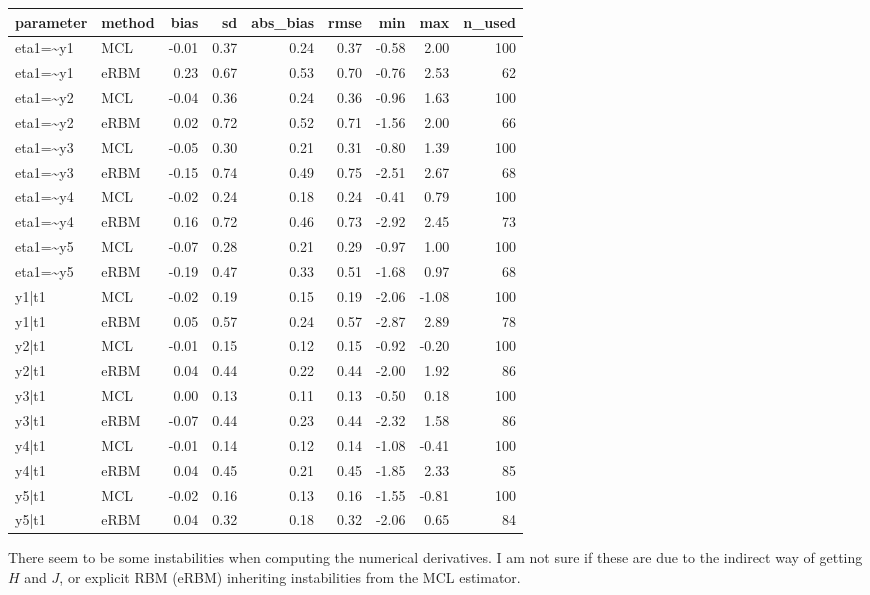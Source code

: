 \documentclass[
]{article}
\begin{document}
\begin{tabular}[t]{llrrrrrrr}
\toprule
parameter & method & bias & sd & abs\_bias & rmse & min & max & n\_used\\
\midrule
eta1=\textasciitilde{}y1 & MCL & -0.01 & 0.37 & 0.24 & 0.37 & -0.58 & 2.00 & 100\\
eta1=\textasciitilde{}y1 & eRBM & 0.23 & 0.67 & 0.53 & 0.70 & -0.76 & 2.53 & 62\\
eta1=\textasciitilde{}y2 & MCL & -0.04 & 0.36 & 0.24 & 0.36 & -0.96 & 1.63 & 100\\
eta1=\textasciitilde{}y2 & eRBM & 0.02 & 0.72 & 0.52 & 0.71 & -1.56 & 2.00 & 66\\
eta1=\textasciitilde{}y3 & MCL & -0.05 & 0.30 & 0.21 & 0.31 & -0.80 & 1.39 & 100\\
eta1=\textasciitilde{}y3 & eRBM & -0.15 & 0.74 & 0.49 & 0.75 & -2.51 & 2.67 & 68\\
eta1=\textasciitilde{}y4 & MCL & -0.02 & 0.24 & 0.18 & 0.24 & -0.41 & 0.79 & 100\\
eta1=\textasciitilde{}y4 & eRBM & 0.16 & 0.72 & 0.46 & 0.73 & -2.92 & 2.45 & 73\\
eta1=\textasciitilde{}y5 & MCL & -0.07 & 0.28 & 0.21 & 0.29 & -0.97 & 1.00 & 100\\
eta1=\textasciitilde{}y5 & eRBM & -0.19 & 0.47 & 0.33 & 0.51 & -1.68 & 0.97 & 68\\
y1|t1 & MCL & -0.02 & 0.19 & 0.15 & 0.19 & -2.06 & -1.08 & 100\\
y1|t1 & eRBM & 0.05 & 0.57 & 0.24 & 0.57 & -2.87 & 2.89 & 78\\
y2|t1 & MCL & -0.01 & 0.15 & 0.12 & 0.15 & -0.92 & -0.20 & 100\\
y2|t1 & eRBM & 0.04 & 0.44 & 0.22 & 0.44 & -2.00 & 1.92 & 86\\
y3|t1 & MCL & 0.00 & 0.13 & 0.11 & 0.13 & -0.50 & 0.18 & 100\\
y3|t1 & eRBM & -0.07 & 0.44 & 0.23 & 0.44 & -2.32 & 1.58 & 86\\
y4|t1 & MCL & -0.01 & 0.14 & 0.12 & 0.14 & -1.08 & -0.41 & 100\\
y4|t1 & eRBM & 0.04 & 0.45 & 0.21 & 0.45 & -1.85 & 2.33 & 85\\
y5|t1 & MCL & -0.02 & 0.16 & 0.13 & 0.16 & -1.55 & -0.81 & 100\\
y5|t1 & eRBM & 0.04 & 0.32 & 0.18 & 0.32 & -2.06 & 0.65 & 84\\
\bottomrule
\end{tabular}

There seem to be some instabilities when computing the numerical
derivatives. I am not sure if these are due to the indirect way of
getting \(H\) and \(J\), or explicit RBM (eRBM) inheriting instabilities
from the MCL estimator.
\end{document}
